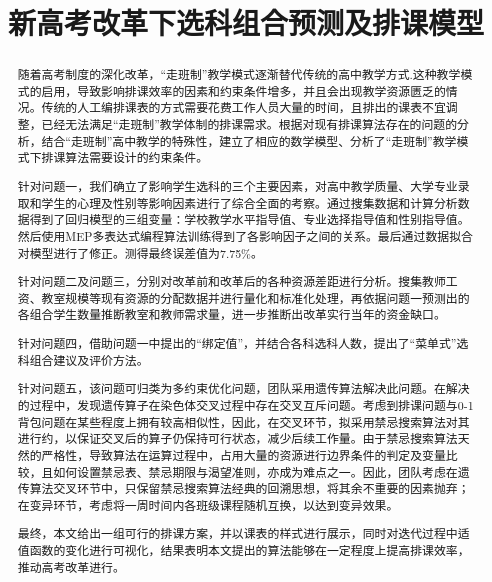 \documentclass[bwprint]{cumcmthesis}
\title{新高考改革下选科组合预测及排课模型}
\begin{document}
 \maketitle
 \begin{abstract}
 
 随着高考制度的深化改革，“走班制”教学模式逐渐替代传统的高中教学方式.这种教学模式的启用，导致影响排课效率的因素和约束条件增多，并且会出现教学资源匮乏的情况。传统的人工编排课表的方式需要花费工作人员大量的时间，且排出的课表不宜调整，已经无法满足“走班制”教学体制的排课需求。根据对现有排课算法存在的问题的分析，结合“走班制”高中教学的特殊性，建立了相应的数学模型、分析了“走班制”教学模式下排课算法需要设计的约束条件。


针对问题一，我们确立了影响学生选科的三个主要因素，对高中教学质量、大学专业录取和学生的心理及性别等影响因素进行了综合全面的考察。通过搜集数据和计算分析数据得到了回归模型的三组变量：学校教学水平指导值、专业选择指导值和性别指导值。然后使用MEP多表达式编程算法训练得到了各影响因子之间的关系。最后通过数据拟合对模型进行了修正。测得最终误差值为7.75\%。

针对问题二及问题三，分别对改革前和改革后的各种资源差距进行分析。搜集教师工资、教室规模等现有资源的分配数据并进行量化和标准化处理，再依据问题一预测出的各组合学生数量推断教室和教师需求量，进一步推断出改革实行当年的资金缺口。


针对问题四，借助问题一中提出的“绑定值”，并结合各科选科人数，提出了“菜单式”选科组合建议及评价方法。

针对问题五，该问题可归类为多约束优化问题，团队采用遗传算法解决此问题。在解决的过程中，发现遗传算子在染色体交叉过程中存在交叉互斥问题。考虑到排课问题与0-1背包问题在某些程度上拥有较高相似性，因此，在交叉环节，拟采用禁忌搜索算法对其进行约，以保证交叉后的算子仍保持可行状态，减少后续工作量。由于禁忌搜索算法天然的严格性，导致算法在运算过程中，占用大量的资源进行边界条件的判定及变量比较，且如何设置禁忌表、禁忌期限与渴望准则，亦成为难点之一。因此，团队考虑在遗传算法交叉环节中，只保留禁忌搜索算法经典的回溯思想，将其余不重要的因素抛弃；在变异环节，考虑将一周时间内各班级课程随机互换，以达到变异效果。

最终，本文给出一组可行的排课方案，并以课表的样式进行展示，同时对迭代过程中适值函数的变化进行可视化，结果表明本文提出的算法能够在一定程度上提高排课效率，推动高考改革进行。

\end{abstract}
\end{document}
